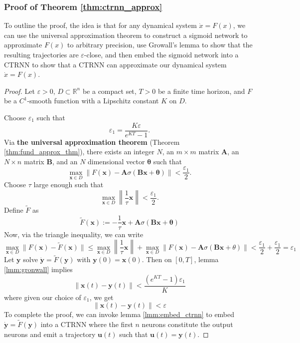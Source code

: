 \documentclass[11pt, letterpaper]{article}
\begin{document}
\subsubsection{Proof of Theorem \ref{thm:ctrnn_approx}}

To outline the proof, the idea is that for any dynamical system $\dot{x}=F(x)$, we can use the universal approximation theorem to construct a sigmoid network to approximate $F(x)$ to arbitrary precision, use Growall's lemma to show that the resulting trajectories are $\varepsilon$-close, and then embed the sigmoid network into a CTRNN to show that a CTRNN can approximate our dynamical system $\dot{x}=F(x)$.

\begin{proof}
Let $\varepsilon>0$, $D\subset\mathbb{R}^n$ be a compact set, $T>0$ be a finite time horizon, and $F$ be a $C^1$-smooth function with a Lipschitz constant $K$ on $D$.

Choose $\varepsilon_1$ such that 
\[
\varepsilon_1 = \frac{K\varepsilon}{e^{KT}-1}.
\]
Via \textbf{the universal approximation theorem} (Theorem \ref{thm:fund_approx_thm}), there exists an integer $N$, an $m\times m$ matrix $\mathbf{A}$, an $N\times n$ matrix $\mathbf{B}$, and an $N$ dimensional vector $\mathbf{\theta}$ such that 
\begin{equation}\label{eq:proof_1_p1}
    \max_{\mathbf{x}\in D}\|F(\mathbf{x})-\mathbf{A}\sigma(\mathbf{B}\mathbf{x}+\mathbf{\theta}) \| < \frac{\varepsilon_1}{2}.
\end{equation}
Choose $\tau$ large enough such that 
\begin{equation}\label{eq:proof_2_p1}
    \max_{\mathbf{x}\in D} \left\| \frac{1}{\tau}\mathbf{x} \right\| < \frac{\varepsilon_1}{2}.
\end{equation}
Define $\tilde{F}$ as 
\[
\tilde{F}(\mathbf{x}):=-\frac{1}{\tau}\mathbf{x} + \mathbf{A}\sigma(\mathbf{B}\mathbf{x}+\mathbf{\theta})
\]
Now, via the triangle inequality, we can write
\[
\max_{\mathbf{x}\in D}\| F(\mathbf{x})- \tilde{F}(\mathbf{x})\| \leq \max_{\mathbf{x}\in D} \left\| \frac{1}{\tau}\mathbf{x} \right\| + \max_{\mathbf{x}\in D} \left\|F(\mathbf{x})-\mathbf{A}\sigma(\mathbf{B}\mathbf{x}+\theta) \right\| < \frac{\varepsilon_1}{2} + \frac{\varepsilon_1}{2} = \varepsilon_1
\]
Let $\mathbf{y}$ solve $\dot{\mathbf{y}}=\tilde{F}(\mathbf{y})$ with $\mathbf{y}(0)=\mathbf{x}(0)$. Then on $[0,T]$, lemma \ref{lmm:gronwall} implies 
\[
\left\| \mathbf{x}(t)-\mathbf{y}(t) \right\| < \frac{\left(e^{KT}-1\right)\varepsilon_1}{K}
\]
where given our choice of $\varepsilon_1$, we get
\[
\left\| \mathbf{x}(t)-\mathbf{y}(t) \right\| < \varepsilon
\]
To complete the proof, we can invoke lemma \ref{lmm:embed_ctrnn} to embed $\dot{\mathbf{y}}=\tilde{F}(\mathbf{y})$ into a CTRNN where the first $n$ neurons constitute the output neurons and emit a trajectory $\mathbf{u}(t)$ such that $\mathbf{u}(t)=\mathbf{y}(t)$.
\end{proof}
\end{document}
